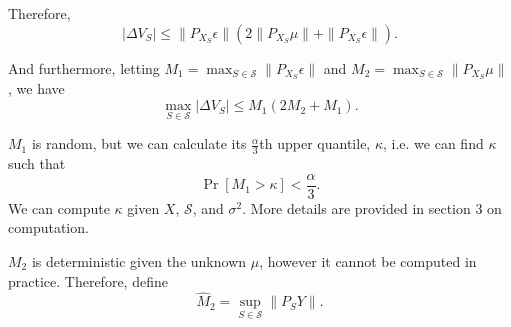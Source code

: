 \documentclass[12pt]{article}
\begin{document}
Therefore,
\[
|\Delta V_S| \leq \|P_{X_S} \epsilon\|(2 \|P_{X_S} \mu\| + \|P_{X_S}\epsilon \|).
\]

And furthermore, letting $M_1 = \max_{S \in \mathcal{S}} \|P_{X_S} \epsilon\|$ and $M_2 =  \max_{S \in \mathcal{S}} \|P_{X_S} \mu\|$,
we have
\[
\max_{S \in \mathcal{S}} |\Delta V_S| \leq M_1(2 M_2 + M_1).
\]

$M_1$ is random, but we can calculate its $\frac{\alpha}{3}$th upper quantile, $\kappa$, i.e. we can find $\kappa$ such that
\[
\Pr[M_1 > \kappa] < \frac{\alpha}{3}.
\]
We can compute $\kappa$ given $X$, $\mathcal{S}$, and $\sigma^2$.  More details are provided in section 3 on computation.

$M_2$ is deterministic given the unknown $\mu$, however it cannot be computed in practice.  Therefore, define
\[
\hat{M}_2 = \sup_{S \in \mathcal{S}} \|P_S Y\|.
\]
\end{document}
